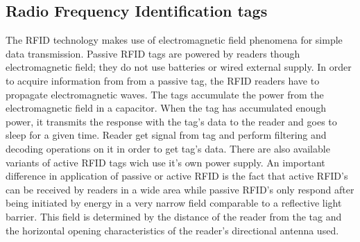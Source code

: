 \documentclass[../main.tex]{subfiles}
\begin{document}
\subsection{Radio Frequency Identification tags} %
\label{sub:rfid_tags}

The RFID technology makes use of electromagnetic field phenomena for simple data transmission. Passive RFID tags are powered by readers though electromagnetic field; they do not use batteries or wired external supply. In order to acquire information from from a passive tag, the RFID readers have to propagate electromagnetic waves. The tags accumulate the power from the electromagnetic field in a capacitor. When the tag has accumulated enough power, it transmits the response with the tag's data to the reader and goes to sleep for a given time. Reader get signal from tag and perform filtering and decoding operations on it in order to get tag's data. There are also available variants of active RFID tags wich use it's own power supply. An important difference in application of passive or active RFID is the fact that active RFID's can be received by readers in a wide area while passive RFID's only respond after being initiated by energy in a very narrow field comparable to a reflective light barrier. This field is determined by the distance of the reader from the tag and the horizontal opening characteristics of the reader's directional antenna used.
\end{document}
